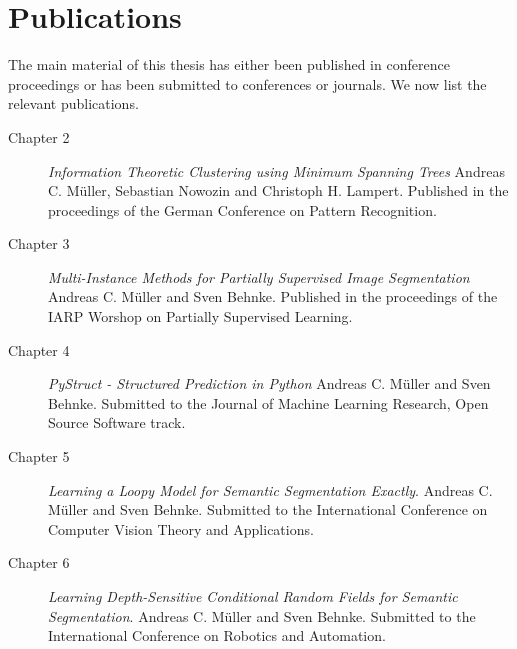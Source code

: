\section{Publications}
The main material of this thesis has either been published in conference proceedings or has been
submitted to conferences or journals. We now list the relevant publications.
\begin{description}
    \item[Chapter 2] \emph{Information Theoretic Clustering using Minimum Spanning Trees} Andreas C. M\"uller, Sebastian Nowozin and Christoph H. Lampert. Published in the proceedings of the German Conference on Pattern Recognition.
    \item[Chapter 3] \emph{Multi-Instance Methods for Partially Supervised Image Segmentation} Andreas C. M\"uller and Sven Behnke. Published in the proceedings of the IARP Worshop on Partially Supervised Learning.
    \item[Chapter 4] \emph{PyStruct - Structured Prediction in Python} Andreas C. M\"uller and Sven Behnke. Submitted to the Journal of Machine Learning Research, Open Source Software track.
    \item[Chapter 5] \emph{Learning a Loopy Model for Semantic Segmentation Exactly}. Andreas C. M\"uller and Sven Behnke. Submitted to the International Conference on Computer Vision Theory and Applications.
    \item[Chapter 6] \emph{Learning Depth-Sensitive Conditional Random Fields for Semantic Segmentation}. Andreas C. M\"uller and Sven Behnke. Submitted to the International Conference on Robotics and Automation.
\end{description}

